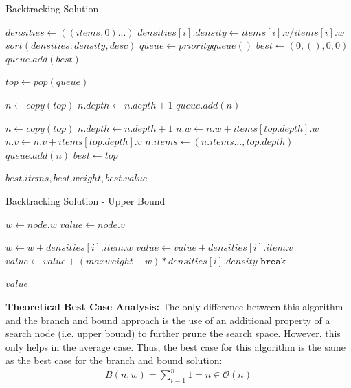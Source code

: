 \documentclass{article}
\begin{document}
\FloatBarrier
\begin{algorithm}
\caption{Backtracking Solution}
\begin{algorithmic}[1]
	\State $densities \gets ((items, 0)...)$
		\State $densities[i].density \gets items[i].v / items[i].w$
	\EndFor
	\State $sort(densities : density, desc)$
	\State $queue \gets priorityqueue()$
	\State $best \gets (0, (), 0, 0)$
	\State $queue.add(best)$

		\State $top \gets pop(queue)$

			\State $n \gets copy(top)$
			\State $n.depth \gets n.depth + 1$
				\State $queue.add(n)$
			\EndIf

				\State $n \gets copy(top)$
				\State $n.depth \gets n.depth + 1$
				\State $n.w \gets n.w + items[top.depth].w$
				\State $n.v \gets n.v + items[top.depth].v$
				\State $n.items \gets (n.items..., top.depth)$
					\State $queue.add(n)$
				\EndIf
			\EndIf
		\Else
				\State $best \gets top$
			\EndIf
		\EndIf
	\EndWhile

	\Return $best.items, best.weight, best.value$
\EndFunction
\end{algorithmic}
\end{algorithm}
\FloatBarrier

\FloatBarrier
\begin{algorithm}[h!]
\caption{Backtracking Solution - Upper Bound}
\begin{algorithmic}[1]
	\State $w \gets node.w$
	\State $value \gets node.v$

			\State $w \gets w + densities[i].item.w$
			\State $value \gets value + densities[i].item.v$
		\Else
			\State $value \gets value + (maxweight - w) * densities[i].density$
			\State $\texttt{break}$
		\EndIf
	\EndFor

	\Return $value$
\EndFunction
\end{algorithmic}
\end{algorithm}
\FloatBarrier

\pagebreak
\textbf{Theoretical Best Case Analysis:}
The only difference between this algorithm and the branch and bound approach is the use of an additional property of a search node (i.e. upper bound) to further prune the search space.
However, this only helps in the average case.
Thus, the best case for this algorithm is the same as the best case for the branch and bound solution:
\begin{align}
B(n, w) = \sum_{i=1}^n{1} = n \in \mathcal{O}(n)
\end{align}
\end{document}
